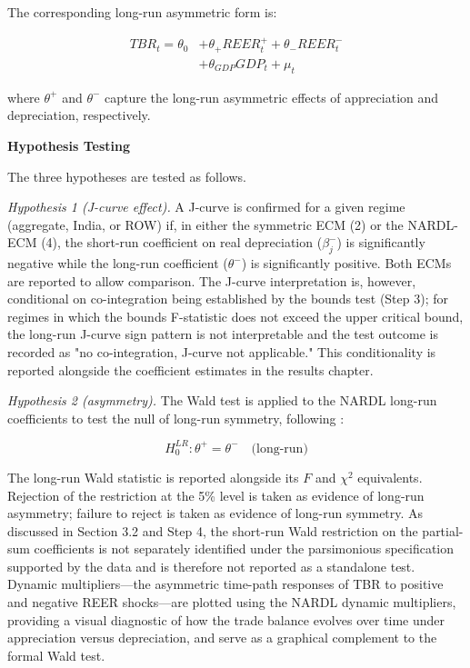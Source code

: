 \documentclass[12pt]{article}
\begin{document}
The corresponding long-run asymmetric form is:

\[
\begin{aligned}
TBR_t = \theta_0 &+ \theta_{+} REER_t^{+} + \theta_{-} REER_t^{-} \\
&+ \theta_{GDP} GDP_t + \mu_t
\end{aligned}
\tag{5}
\]

where $\theta^{+}$ and $\theta^{-}$ capture the long-run asymmetric effects of appreciation and depreciation, respectively.

\vspace{0.3cm}
\noindent\textbf{Hypothesis Testing}

The three hypotheses are tested as follows.

\noindent\textit{Hypothesis 1 (J-curve effect).} A J-curve is confirmed for a given regime (aggregate, India, or ROW) if, in either the symmetric ECM (2) or the NARDL-ECM (4), the short-run coefficient on real depreciation ($\beta_j^{-}$) is significantly negative while the long-run coefficient ($\theta^{-}$) is significantly positive. Both ECMs are reported to allow comparison. The J-curve interpretation is, however, conditional on co-integration being established by the bounds test (Step 3); for regimes in which the bounds F-statistic does not exceed the upper critical bound, the long-run J-curve sign pattern is not interpretable and the test outcome is recorded as "no co-integration, J-curve not applicable." This conditionality is reported alongside the coefficient estimates in the results chapter.

\noindent\textit{Hypothesis 2 (asymmetry).} The Wald test is applied to the NARDL long-run coefficients to test the null of long-run symmetry, following \textcite{Shin2014-ap}:

\[
H_0^{LR}: \theta^{+} = \theta^{-} \quad \text{(long-run)}
\tag{6}
\]

The long-run Wald statistic is reported alongside its $F$ and $\chi^2$ equivalents. Rejection of the restriction at the 5\% level is taken as evidence of long-run asymmetry; failure to reject is taken as evidence of long-run symmetry. As discussed in Section 3.2 and Step 4, the short-run Wald restriction on the partial-sum coefficients is not separately identified under the parsimonious specification supported by the data and is therefore not reported as a standalone test. Dynamic multipliers—the asymmetric time-path responses of TBR to positive and negative REER shocks—are plotted using the NARDL dynamic multipliers, providing a visual diagnostic of how the trade balance evolves over time under appreciation versus depreciation, and serve as a graphical complement to the formal Wald test.
\end{document}
